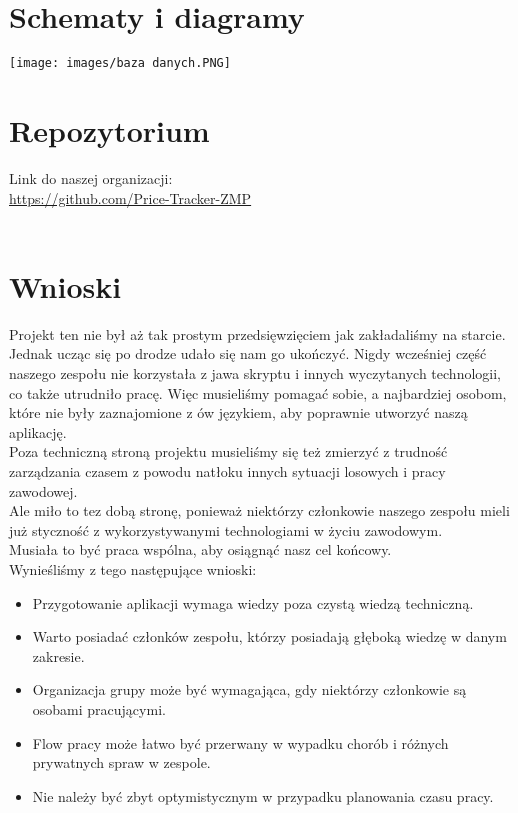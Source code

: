 \documentclass{article}
\begin{document}
\section{Schematy i diagramy}
    \texttt{[image: images/baza danych.PNG]}\\
    
\section{Repozytorium}
Link do naszej organizacji: \\
\url{https://github.com/Price-Tracker-ZMP}\\\\

\section{Wnioski}
   Projekt ten nie był aż tak prostym przedsięwzięciem jak zakładaliśmy na starcie. Jednak ucząc się po drodze udało się nam go ukończyć. Nigdy wcześniej część naszego zespołu nie korzystała z jawa skryptu i innych wyczytanych technologii, co także utrudniło pracę. Więc musieliśmy pomagać sobie, a najbardziej osobom, które nie były zaznajomione z ów językiem, aby poprawnie utworzyć naszą aplikację.\\
    Poza techniczną stroną projektu musieliśmy się też zmierzyć z trudność zarządzania czasem z powodu natłoku innych sytuacji losowych i pracy zawodowej.\\
    Ale miło to tez dobą stronę, ponieważ niektórzy członkowie naszego zespołu mieli już styczność z wykorzystywanymi technologiami w życiu zawodowym.\\
    Musiała to być praca wspólna, aby osiągnąć nasz cel końcowy.\\
    
    Wynieśliśmy z tego następujące wnioski:\\
    \begin{itemize}
        \item Przygotowanie aplikacji wymaga wiedzy poza czystą wiedzą techniczną.
        \item Warto posiadać członków zespołu, którzy posiadają głęboką wiedzę w danym zakresie.
        \item Organizacja grupy może być wymagająca, gdy niektórzy członkowie są osobami pracującymi.
        \item Flow pracy może łatwo być przerwany w wypadku chorób i różnych prywatnych spraw w zespole.
        \item Nie należy być zbyt optymistycznym w przypadku planowania czasu pracy.
    \end{itemize}
\end{document}
